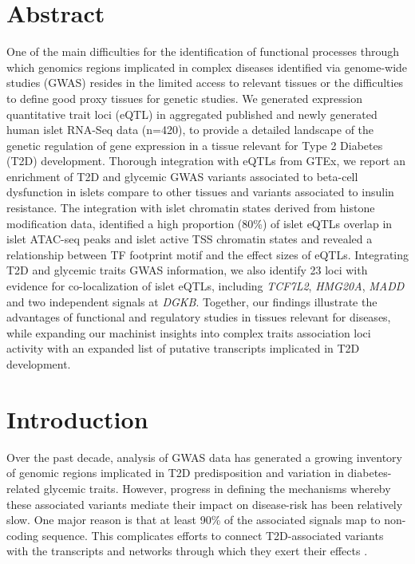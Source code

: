 \section{Abstract}
One of the main difficulties for the identification of functional processes through which genomics regions implicated in complex diseases identified via genome-wide studies (GWAS) resides in the limited access to relevant tissues or the difficulties to define good proxy tissues for genetic studies. We generated expression quantitative trait loci (eQTL) in aggregated published and newly generated human islet RNA-Seq data (n=420), to provide a detailed landscape of the genetic regulation of gene expression in a tissue relevant for Type 2 Diabetes (T2D) development. Thorough integration with eQTLs from GTEx, we report an enrichment of T2D and glycemic GWAS variants associated to beta-cell dysfunction in islets compare to other tissues and variants associated to insulin resistance. The integration with islet chromatin states derived from histone modification data, identified a high proportion (80\%) of islet eQTLs overlap in islet ATAC-seq peaks and islet active TSS chromatin states and revealed a relationship between TF footprint motif and the effect sizes of eQTLs. Integrating T2D and glycemic traits GWAS information, we also identify 23 loci with evidence for co-localization of islet eQTLs, including \textit{TCF7L2}, \textit{HMG20A}, \textit{MADD} and two independent signals at \textit{DGKB}. Together, our findings illustrate the advantages of functional and regulatory studies in tissues relevant for diseases, while expanding our machinist insights into complex traits association loci activity with an expanded list of putative transcripts implicated in T2D development.

\section{Introduction}
Over the past decade, analysis of GWAS data has generated a growing inventory of genomic regions implicated in T2D predisposition and variation in diabetes-related glycemic traits. However, progress in defining the mechanisms whereby these associated variants mediate their impact on disease-risk has been relatively slow. One major reason is that at least 90\% of the associated signals map to non-coding sequence. This complicates efforts to connect T2D-associated variants with the transcripts and networks through which they exert their effects \cite{thediabetesgeneticsreplicationandmeta-analysisdiagramconsortiumLargescaleAssociationAnalysis2012,thediabetesgeneticsreplicationandmeta-analysisdiagramconsortiumGenomewideTransancestryMetaanalysis2014,fuchsbergerGeneticArchitectureType2016a,scottExpandedGenomeWideAssociation2017,mahajanFinemappingTypeDiabetes2018}. \\
    
